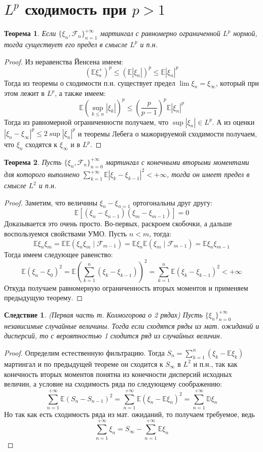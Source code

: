 \documentclass[12pt,a4paper]{article} %
\newtheorem{theorem}{Теорема}
\newtheorem{consequence}{Следствие}
\newcommand{\E}{\mathbb{E}}
\newcommand{\D}{\mathbb{D}}
\newcommand{\F}{\mathcal{F}}
\begin{document}
	\section{$L^p$ сходимость при $p>1$}
	\begin{theorem}
		Если $\{\xi_n,\F_n\}_{n=1}^{+\infty}$ мартингал с равномерно ограниченной $L^p$ нормой, тогда существует его предел в смысле $L^p$ и п.н.
	\end{theorem}
	\begin{proof}
		Из неравенства Йенсена имеем:
		$$(\E\xi_n^{+})^p\leq(\E|\xi_n|)^p\leq\E|\xi_n|^p$$
		Тогда из теоремы о сходимости п.н. существует предел $\lim\xi_n=\xi_{\infty}$, который при этом лежит в $L^p$, а также имеем:
		$$\E(\sup\limits_{k\leq n}|\xi_k|)^p\leq\left(\frac{p}{p-1}\right)^p\E|\xi_n|^p$$
		Тогда из равномерной ограниченности получаем, что $\sup|\xi_n|\in L^p$. А из оценки\\ $|\xi_n-\xi_{\infty}|^p\leq2\sup|\xi_n|^p$ и теоремы Лебега о мажорируемой сходимости получаем, что $\xi_n$ сходятся к $\xi_{\infty}$ и в $L^p$.
	\end{proof}
	\begin{theorem}
		Пусть $\{\xi_n,\F_n\}_{n=0}^{+\infty}$ мартингал с конечными вторыми моментами для которого выполнено $\displaystyle\sum_{k=1}^{+\infty}\E|\xi_k-\xi_{k-1}|^2<+\infty$, тогда он имеет предел в смысле $L^2$ и п.н.
	\end{theorem}
	\begin{proof}
		Заметим, что величины $\xi_n-\xi_{n=1}$ ортогональны друг другу:
		$$\E\left[(\xi_n-\xi_{n-1})(\xi_m-\xi_{m-1})\right]=0$$
		Доказывается это очень просто. Во-первых, раскроем скобочки, а дальше воспользуемся свойствами УМО. Пусть $n<m$, тогда:
		$$\E\xi_n\xi_m=\E\E(\xi_n\xi_m\mid\F_{m-1})=\E\xi_n\E(\xi_m\mid\F_{m-1})=\E\xi_n\xi_{m-1}$$
		Тогда имеем следующее равенство:
		$$\E(\xi_n-\xi_0)^2=\E\left(\sum_{k=1}^n(\xi_k-\xi_{k-1})\right)^2=\sum_{k=1}^n\E(\xi_k-\xi_{k-1})^2<+\infty$$
		Откуда получаем равномерную ограниченность вторых моментов и применяем предыдущую теорему.
	\end{proof}
	\begin{consequence}
		(Первая часть т. Колмогорова о 2 рядах) Пусть $\{\xi_n\}_{n=0}^{+\infty}$ независимые случайные величины. Тогда если сходятся ряды из мат. ожиданий и дисперсий, то с вероятностью 1 сходится ряд из случайных величин.
	\end{consequence}
	\begin{proof}
		Определим естественную фильтрацию. Тогда $S_n=\displaystyle\sum_{k=1}^n(\xi_k-\E\xi_k)$ мартингал и по предыдущей теореме он сходится к $S_{\infty}$ в $L^2$ и п.н., так как конечность вторых моментов понятна из конечности дисперсий исходных величин, а условие на сходимость ряда по следующему соображению:
		$$\sum_{n=1}^{+\infty}\E(S_n-S_{n-1})^2=\sum_{n=1}^{+\infty}\E(\xi_n-\E\xi_n)^2=\sum_{n=1}^{+\infty}\D\xi_n$$
		Но так как есть сходимость ряда из мат. ожиданий, то получаем требуемое, ведь
		$$\sum_{n=1}^{+\infty}\xi_n=S_{\infty}-\sum_{n=1}^{+\infty}\E\xi_n$$
	\end{proof}
\end{document}
